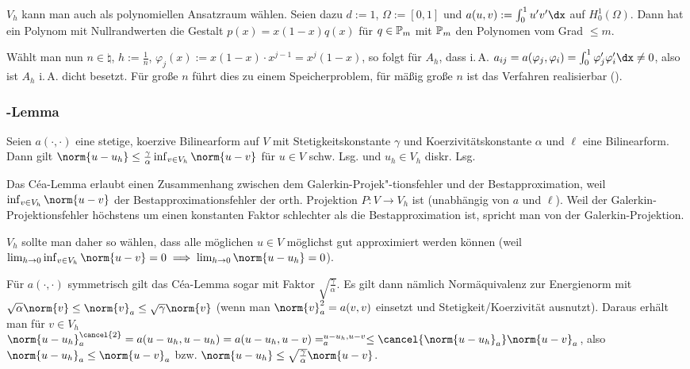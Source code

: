 \linie

\begin{Bsp}
    $V_h$ kann man auch als polynomiellen Ansatzraum wählen.
    Seien dazu $d := 1$, $\Omega := [0, 1]$ und
    $a(u, v) := \int_0^1 u'v' \dx$ auf $H^1_0(\Omega)$.
    Dann hat ein Polynom mit Nullrandwerten die Gestalt $p(x) = x(1-x)q(x)$ für $q \in \mathbb{P}_m$
    mit $\mathbb{P}_m$ den Polynomen vom Grad $\le m$.
    
    Wählt man nun $n \in \natural$, $h := \frac{1}{n}$,
    $\varphi_j(x) := x(1-x) \cdot x^{j-1} = x^j (1-x)$, so folgt für $A_h$, dass i.\,A.
    $a_{ij} = a(\varphi_j, \varphi_i) = \int_0^1 \varphi_j' \varphi_i' \dx \not= 0$,
    also ist $A_h$ i.\,A. dicht besetzt.
    Für große $n$ führt dies zu einem Speicherproblem,
    für mäßig große $n$ ist das Verfahren realisierbar ().
\end{Bsp}

\subsubsection{%
    -Lemma%
}

\begin{Lemma}{}
    Seien $a(\cdot, \cdot)$ eine stetige, koerzive Bilinearform auf $V$ mit
    Stetigkeitskonstante $\gamma$ und Koerzivitätskonstante $\alpha$
    und $\ell$ eine Bilinearform.\\
    Dann gilt $\norm{u - u_h} \le \frac{\gamma}{\alpha} \inf_{v \in V_h} \norm{u - v}$
    für $u \in V$ schw. Lsg. und $u_h \in V_h$ diskr. Lsg.
\end{Lemma}

\linie

\begin{Bem}
    Das Céa-Lemma erlaubt einen Zusammenhang zwischen dem Galerkin-Projek"-tionsfehler und
    der Bestapproximation, weil $\inf_{v \in V_h} \norm{u - v}$ der Bestapproximationsfehler
    der orth. Projektion $P\colon V \to V_h$ ist (unabhängig von $a$ und $\ell$).
    Weil der Galerkin-Projektionsfehler höchstens um einen konstanten Faktor schlechter als
    die Bestapproximation ist, spricht man von  der Galerkin-Projektion.
    
    $V_h$ sollte man daher so wählen,
    dass alle möglichen $u \in V$ möglichst gut approximiert werden können
    (weil $\lim_{h \to 0} \inf_{v \in V_h} \norm{u - v} = 0 \implies
    \lim_{h \to 0} \norm{u - u_h} = 0$).
    
    Für $a(\cdot, \cdot)$ symmetrisch gilt das Céa-Lemma sogar mit Faktor
    $\sqrt{\frac{\gamma}{\alpha}}$.
    Es gilt dann nämlich Normäquivalenz zur Energienorm mit
    $\sqrt{\alpha} \norm{v} \le \norm{v}_a \le \sqrt{\gamma} \norm{v}$
    (wenn man $\norm{v}_a^2 = a(v, v)$ einsetzt und Stetigkeit/Koerzivität ausnutzt).
    Daraus erhält man für $v \in V_h$\\
    $\norm{u - u_h}_a^{\cancel{2}} = a(u - u_h, u - u_h) = a(u - u_h, u - v) =
    \sp{u - u_h, u - v}_a \le \cancel{\norm{u - u_h}_a} \norm{u - v}_a$,
    also $\norm{u - u_h}_a \le \norm{u - v}_a$ bzw.
    $\norm{u - u_h} \le \sqrt{\frac{\gamma}{\alpha}} \norm{u - v}$.
\end{Bem}

